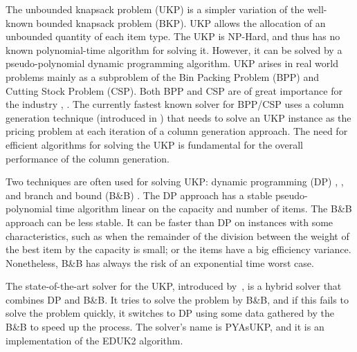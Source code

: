 \documentclass[runningheads,a4paper]{llncs}
\begin{document}
The unbounded knapsack problem (UKP) is a simpler variation of the well-known bounded knapsack problem (BKP).
UKP allows the allocation of an unbounded quantity of each item type.
The UKP is NP-Hard, and thus has no known polynomial-time algorithm for solving it. 
However, it can be solved by a pseudo-polynomial dynamic programming algorithm.
UKP arises in real world problems mainly as a subproblem of the Bin Packing Problem (BPP) and Cutting Stock Problem (CSP). 
Both BPP and CSP are of great importance for the industry \cite{survey2014}, \cite{gg-1,gg-2}. 
The currently fastest known solver for BPP/CSP\cite{belov,survey2014}
uses a column generation technique (introduced in \cite{gg-1}) that needs to solve an UKP instance as the pricing problem at each iteration of a column generation approach. 
The need for efficient algorithms for solving the UKP is fundamental for the overall performance of the column generation.

Two techniques are often used for solving UKP: dynamic programming (DP) \cite{eduk}, \cite[p. 214]{gar72}, \cite[p. 311]{tchu} and branch and bound (B\&B) \cite{mtu2}. 
The DP approach has a stable pseudo-polynomial time algorithm linear on the capacity and number of items. 
The B\&B approach can be less stable. 
It can be faster than DP on instances with some characteristics, such as when the remainder of the division between the weight of the best item by the capacity is small; or the items have a big efficiency variance. Nonetheless, B\&B has always the risk of an exponential time worst case.

The state-of-the-art solver for the UKP, introduced by~\cite{pya}, is a hybrid solver that combines DP and B\&B. 
It tries to solve the problem by B\&B, and if this fails to solve the problem quickly, it switches to DP using some data gathered by the B\&B to speed up the process. 
The solver's name is PYAsUKP, and it is an implementation of the EDUK2 algorithm.

\end{document}
